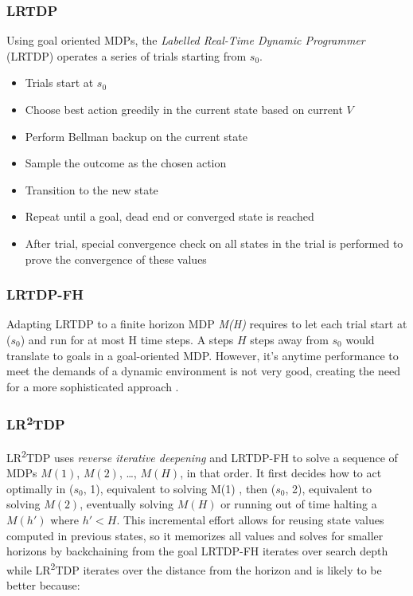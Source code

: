 \documentclass[runningheads,a4paper]{llncs}
\begin{document}
\subsubsection{LRTDP}
Using goal oriented MDPs, the \emph{Labelled Real-Time Dynamic Programmer} (LRTDP) operates a series of trials starting from $s_0$.

\begin{itemize}
	\item Trials start at $s_0$
	\item Choose best action greedily in the current state based on current $V$
	\item Perform  Bellman backup on the current state
	\item Sample the outcome as the chosen action
	\item Transition to the new state
	\item Repeat until a goal, dead end or converged state is reached
	\item After trial, special convergence check on all states in the trial is performed to prove the convergence of these values
\end{itemize}

\subsubsection{LRTDP-FH}

Adapting LRTDP to a finite horizon MDP \emph{M(H)} requires to let each trial start at ($s_0$) and run for at most H time steps. A steps $H$ steps away from $s_0$ would translate to goals in a goal-oriented MDP. However, it's anytime performance to meet the demands of a dynamic environment is not very good, creating the need for a more sophisticated approach \cite{kolobov2012glutton}.

\subsubsection{LR\textsuperscript{2}TDP}

LR\textsuperscript{2}TDP uses \emph{reverse iterative deepening} and LRTDP-FH to solve a sequence of MDPs $M(1)$, $M(2)$, \ldots , $M(H)$, in that order. It first decides how to act optimally in ($s_0$, 1), equivalent to solving M(1) , then ($s_0$, 2), equivalent to solving $M(2)$, eventually solving $M(H)$ or running out of time halting a $M(h')$ where $h' < H$. This incremental effort allows for reusing state values computed in previous states, so it memorizes all values and solves for smaller horizons by backchaining from the goal LRTDP-FH iterates over search depth while LR\textsuperscript{2}TDP iterates over the distance from the horizon and is likely to be better because:
\end{document}
